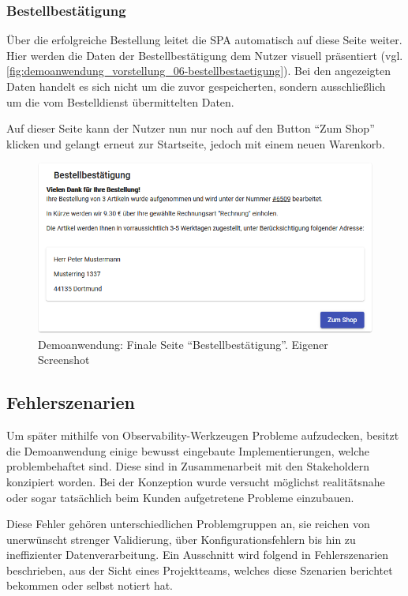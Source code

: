 \subsubsection{Bestellbestätigung}

Über die erfolgreiche Bestellung leitet die SPA automatisch auf diese Seite weiter. Hier werden die Daten der Bestellbestätigung dem Nutzer visuell präsentiert (vgl. \autoref{fig:demoanwendung_vorstellung_06-bestellbestaetigung}). Bei den angezeigten Daten handelt es sich nicht um die zuvor gespeicherten, sondern ausschließlich um die vom Bestelldienst übermittelten Daten.

Auf dieser Seite kann der Nutzer nun nur noch auf den Button \enquote{Zum Shop} klicken und gelangt erneut zur Startseite, jedoch mit einem neuen Warenkorb.

\begin{figure}[H]
	\centering
	\includegraphics[width=0.75\linewidth]{img/04_erstellung-poc/demoanwendung_vorstellung_06-bestellbestaetigung.png}
	\caption{Demoanwendung: Finale Seite \enquote{Bestellbestätigung}. Eigener Screenshot}
	\label{fig:demoanwendung_vorstellung_06-bestellbestaetigung}
\end{figure}

\subsection{Fehlerszenarien}
\label{subsec:fehlerszenarien}

Um später mithilfe von Observability-Werkzeugen Probleme aufzudecken, besitzt die Demoanwendung einige bewusst eingebaute Implementierungen, welche problembehaftet sind. Diese sind in Zusammenarbeit mit den Stakeholdern konzipiert worden. Bei der Konzeption wurde versucht möglichst realitätsnahe oder sogar tatsächlich beim Kunden aufgetretene Probleme einzubauen.

Diese Fehler gehören unterschiedlichen Problemgruppen an, sie reichen von unerwünscht strenger Validierung, über Konfigurationsfehlern bis hin zu ineffizienter Datenverarbeitung. Ein Ausschnitt wird folgend in Fehlerszenarien beschrieben, aus der Sicht eines Projektteams, welches diese Szenarien berichtet bekommen oder selbst notiert hat.

